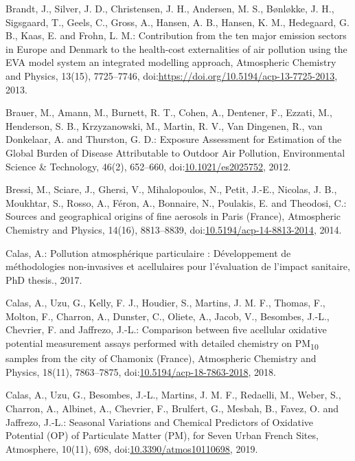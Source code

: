 \documentclass[
]{article}
\begin{document}
Brandt, J., Silver, J. D., Christensen, J. H., Andersen, M. S.,
Bønløkke, J. H., Sigsgaard, T., Geels, C., Gross, A., Hansen, A. B.,
Hansen, K. M., Hedegaard, G. B., Kaas, E. and Frohn, L. M.: Contribution
from the ten major emission sectors in Europe and Denmark to the
health-cost externalities of air pollution using the EVA model system an
integrated modelling approach, Atmospheric Chemistry and Physics,
13(15), 7725--7746,
doi:\href{https://doi.org/https://doi.org/10.5194/acp-13-7725-2013}{https://doi.org/10.5194/acp-13-7725-2013},
2013.

Brauer, M., Amann, M., Burnett, R. T., Cohen, A., Dentener, F., Ezzati,
M., Henderson, S. B., Krzyzanowski, M., Martin, R. V., Van Dingenen, R.,
van Donkelaar, A. and Thurston, G. D.: Exposure Assessment for
Estimation of the Global Burden of Disease Attributable to Outdoor Air
Pollution, Environmental Science \& Technology, 46(2), 652--660,
doi:\href{https://doi.org/10.1021/es2025752}{10.1021/es2025752}, 2012.

Bressi, M., Sciare, J., Ghersi, V., Mihalopoulos, N., Petit, J.-E.,
Nicolas, J. B., Moukhtar, S., Rosso, A., Féron, A., Bonnaire, N.,
Poulakis, E. and Theodosi, C.: Sources and geographical origins of fine
aerosols in Paris (France), Atmospheric Chemistry and Physics, 14(16),
8813--8839,
doi:\href{https://doi.org/10.5194/acp-14-8813-2014}{10.5194/acp-14-8813-2014},
2014.

Calas, A.: Pollution atmosphérique particulaire : Développement de
méthodologies non-invasives et acellulaires pour l'évaluation de
l'impact sanitaire, PhD thesis., 2017.

Calas, A., Uzu, G., Kelly, F. J., Houdier, S., Martins, J. M. F.,
Thomas, F., Molton, F., Charron, A., Dunster, C., Oliete, A., Jacob, V.,
Besombes, J.-L., Chevrier, F. and Jaffrezo, J.-L.: Comparison between
five acellular oxidative potential measurement assays performed with
detailed chemistry on PM\textsubscript{10} samples from the city of
Chamonix (France), Atmospheric Chemistry and Physics, 18(11),
7863--7875,
doi:\href{https://doi.org/10.5194/acp-18-7863-2018}{10.5194/acp-18-7863-2018},
2018.

Calas, A., Uzu, G., Besombes, J.-L., Martins, J. M. F., Redaelli, M.,
Weber, S., Charron, A., Albinet, A., Chevrier, F., Brulfert, G., Mesbah,
B., Favez, O. and Jaffrezo, J.-L.: Seasonal Variations and Chemical
Predictors of Oxidative Potential (OP) of Particulate Matter (PM), for
Seven Urban French Sites, Atmosphere, 10(11), 698,
doi:\href{https://doi.org/10.3390/atmos10110698}{10.3390/atmos10110698},
2019.
\end{document}

